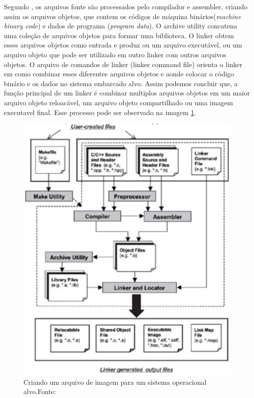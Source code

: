 Segundo , os arquivos fonte são processados pelo compilador e assembler, criando assim os arquivos objetos, que contem os códigos de máquina binários(\textit{machine binary code}) e dados de programa (\textit{program data}). O archive utility concatena uma coleção de arquivos objetos para formar uma biblioteca. O linker obtem esses arquivos objetos como entrada e produz ou um arquivo executável, ou um arquivo objeto que pode ser utilizado em outro linker com outros arquivos objetos. O arquivo de comandos de linker (linker command file) orienta o linker em como combinar esses diferentes arquivos objetos e aonde colocar o código binário e os dados no sistema embarcado alvo. Assim podemos concluir que, a função principal de um linker é combinar multiplos arquivos objetos em um maior arquivo objeto reloacável, um arquivo objeto compartilhado ou uma imagem executavel final. Esse processo pode ser observado na imagem \ref{linker}.

\begin{figure}[H]
    \scriptsize
     \centering
     \includegraphics[scale=1]{dados/figuras/Linker.png}
     \caption{Criando um arquivo de imagem para um sistema operacional alvo.\newline Fonte:\cite{Qing2003}}
     \label{linker}
\end{figure}

